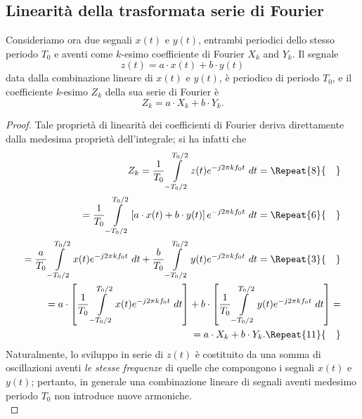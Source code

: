 \documentclass[12pt,oneside,openany]{memoir}
\numberwithin{equation}{subsection}
\newcommand{\quads}[1]{\Repeat{#1}{\quad}}
\newcommand{\dt}{\ dt}
\begin{document}
\newpage
\subsection{Linearit\`a della trasformata serie di Fourier}
Consideriamo ora due segnali $x(t)$ e $y(t)$, entrambi periodici dello stesso periodo $T_0$ e aventi come $k$-esimo coefficiente di Fourier $X_k$ and $Y_k$. Il segnale
\begin{equation}
	z(t) = a \cdot x(t) + b \cdot y(t)
\end{equation}
data dalla combinazione lineare di $x(t)$ e $y(t)$, \`e periodico di periodo $T_0$, e il coefficiente \textit{k}-esimo $Z_k$ della sua serie di Fourier \`e
\begin{equation}
	Z_k = a \cdot X_k + b \cdot Y_k.
\end{equation}
\begin{proof}
Tale propriet\`a di linearit\`a dei coefficienti di Fourier deriva direttamente dalla medesima propriet\`a dell'integrale; si ha infatti che
\begin{equation}
\begin{split}
	Z_k = \frac{1}{T_0} \int\displaylimits_{-T_0/2}^{T_0/2} z(t) e^{-j 2 \pi k f_0 t} \dt =
	\quads{8}
	\\
	= \frac{1}{T_0} \int\displaylimits_{-T_0/2}^{T_0/2} \left[a \cdot x(t) + b \cdot y(t)\right] e^{-j 2 \pi k f_0 t} \dt =
	\quads{6}
	\\
	= \frac{a}{T_0} \int\displaylimits_{-T_0/2}^{T_0/2} x(t) e^{-j 2 \pi k f_0 t} \dt + \frac{b}{T_0} \int\displaylimits_{-T_0/2}^{T_0/2} y(t) e^{-j 2 \pi k f_0 t} \dt =
	\quads{3}
	\\
	= a \cdot \left[\frac{1}{T_0} \int\displaylimits_{-T_0/2}^{T_0/2} x(t) e^{-j 2 \pi k f_0 t} \dt \right] + b \cdot \left[\frac{1}{T_0} \int\displaylimits_{-T_0/2}^{T_0/2} y(t) e^{-j 2 \pi k f_0 t} \dt \right] =
	\\
	= a \cdot X_k + b \cdot Y_k.
	\quads{11}
\end{split}
\end{equation}
Naturalmente, lo sviluppo in serie di $z(t)$ \`e costituito da una somma di oscillazioni aventi \textit{le stesse frequenze} di quelle che compongono i segnali $x(t)$ e $y(t)$; pertanto, in generale una combinazione lineare di segnali aventi medesimo periodo $T_0$ non introduce nuove armoniche.\\
\end{proof}

\newpage
\end{document}
